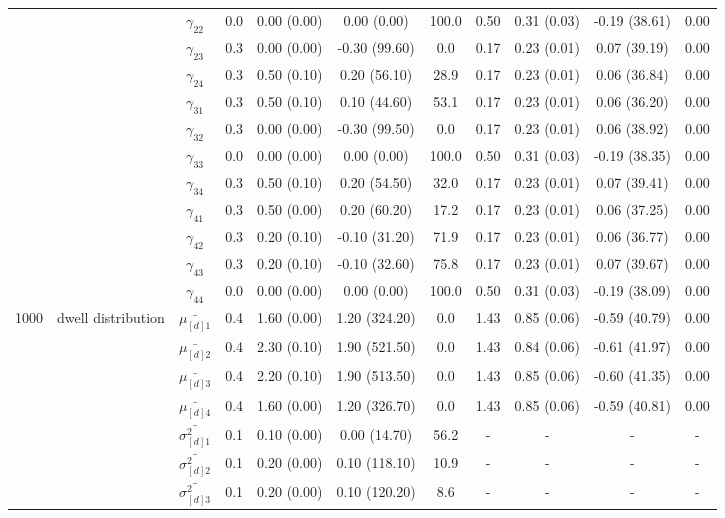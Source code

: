 \begin{table}[h]
{\begin{tabular}{ccccccccccc}
 &  & $\gamma_{22}$ & 0.0 & 0.00 (0.00) & 0.00 (0.00) & 100.0 & 0.50 & 0.31 (0.03) & -0.19 (38.61) & 0.00 \\
 &  & $\gamma_{23}$ & 0.3 & 0.00 (0.00) & -0.30 (99.60) & 0.0 & 0.17 & 0.23 (0.01) & 0.07 (39.19) & 0.00 \\
 &  & $\gamma_{24}$ & 0.3 & 0.50 (0.10) & 0.20 (56.10) & 28.9 & 0.17 & 0.23 (0.01) & 0.06 (36.84) & 0.00 \\
 &  & $\gamma_{31}$ & 0.3 & 0.50 (0.10) & 0.10 (44.60) & 53.1 & 0.17 & 0.23 (0.01) & 0.06 (36.20) & 0.00 \\
 &  & $\gamma_{32}$ & 0.3 & 0.00 (0.00) & -0.30 (99.50) & 0.0 & 0.17 & 0.23 (0.01) & 0.06 (38.92) & 0.00 \\
 &  & $\gamma_{33}$ & 0.0 & 0.00 (0.00) & 0.00 (0.00) & 100.0 & 0.50 & 0.31 (0.03) & -0.19 (38.35) & 0.00 \\
 &  & $\gamma_{34}$ & 0.3 & 0.50 (0.10) & 0.20 (54.50) & 32.0 & 0.17 & 0.23 (0.01) & 0.07 (39.41) & 0.00 \\
 &  & $\gamma_{41}$ & 0.3 & 0.50 (0.00) & 0.20 (60.20) & 17.2 & 0.17 & 0.23 (0.01) & 0.06 (37.25) & 0.00 \\
 &  & $\gamma_{42}$ & 0.3 & 0.20 (0.10) & -0.10 (31.20) & 71.9 & 0.17 & 0.23 (0.01) & 0.06 (36.77) & 0.00 \\
 &  & $\gamma_{43}$ & 0.3 & 0.20 (0.10) & -0.10 (32.60) & 75.8 & 0.17 & 0.23 (0.01) & 0.07 (39.67) & 0.00 \\
 &  & $\gamma_{44}$ & 0.0 & 0.00 (0.00) & 0.00 (0.00) & 100.0 & 0.50 & 0.31 (0.03) & -0.19 (38.09) & 0.00 \\ \midrule
1000 & dwell distribution & $\bar{\mu_{[d]1}}$ & 0.4 & 1.60 (0.00) & 1.20 (324.20) & 0.0 & 1.43 & 0.85 (0.06) & -0.59 (40.79) & 0.00 \\
\multirow{39}{*}{} & \multirow{7}{*}{} & $\bar{\mu_{[d]2}}$ & 0.4 & 2.30 (0.10) & 1.90 (521.50) & 0.0 & 1.43 & 0.84 (0.06) & -0.61 (41.97) & 0.00 \\
 &  & $\bar{\mu_{[d]3}}$ & 0.4 & 2.20 (0.10) & 1.90 (513.50) & 0.0 & 1.43 & 0.85 (0.06) & -0.60 (41.35) & 0.00 \\
 &  & $\bar{\mu_{[d]4}}$ & 0.4 & 1.60 (0.00) & 1.20 (326.70) & 0.0 & 1.43 & 0.85 (0.06) & -0.59 (40.81) & 0.00 \\
 &  & $\bar{\sigma^2_{[d]1}}$ & 0.1 & 0.10 (0.00) & 0.00 (14.70) & 56.2 & - & - & - & - \\
 &  & $\bar{\sigma^2_{[d]2}}$ & 0.1 & 0.20 (0.00) & 0.10 (118.10) & 10.9 & - & - & - & - \\
 &  & $\bar{\sigma^2_{[d]3}}$ & 0.1 & 0.20 (0.00) & 0.10 (120.20) & 8.6 & - & - & - & - \\

\end{tabular}}
\end{table}
